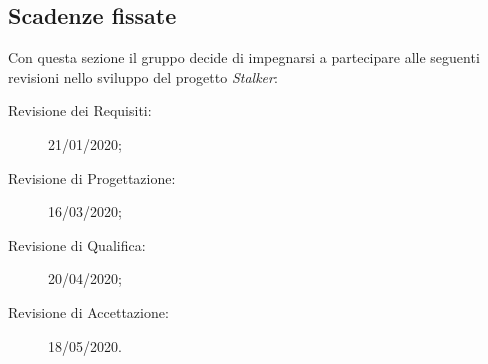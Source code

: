 \documentclass[../piano-di-progetto.tex]{subfiles}
\begin{document}
\subsection{Scadenze fissate}%
\label{sub:scadenze_fissate}
Con questa sezione il gruppo decide di impegnarsi a partecipare alle seguenti revisioni nello sviluppo del progetto \textit{Stalker}:
  \begin{description}
    \item[Revisione dei Requisiti:] 21/01/2020;
    \item[Revisione di Progettazione:] 16/03/2020;
    \item[Revisione di Qualifica:] 20/04/2020;
    \item[Revisione di Accettazione:] 18/05/2020.
  \end{description}
\end{document}
